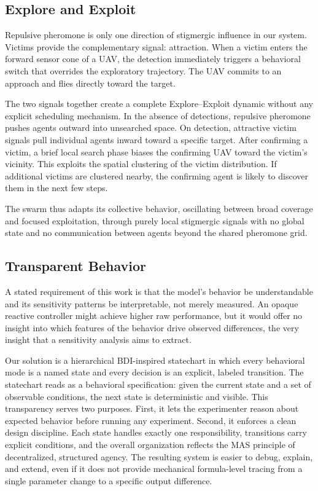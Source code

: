 \documentclass[10pt,a4paper,twocolumn]{article}
\begin{document}
\subsection{Explore and Exploit}

Repulsive pheromone is only one direction of stigmergic influence in our system. Victims provide the complementary signal: attraction. When a victim enters the forward sensor cone of a UAV, the detection immediately triggers a behavioral switch that overrides the exploratory trajectory. The UAV commits to an approach and flies directly toward the target.

The two signals together create a complete Explore--Exploit dynamic without any explicit scheduling mechanism. In the absence of detections, repulsive pheromone pushes agents outward into unsearched space. On detection, attractive victim signals pull individual agents inward toward a specific target. After confirming a victim, a brief local search phase biases the confirming UAV toward the victim's vicinity. This exploits the spatial clustering of the victim distribution. If additional victims are clustered nearby, the confirming agent is likely to discover them in the next few steps.

The swarm thus adapts its collective behavior, oscillating between broad coverage and focused exploitation, through purely local stigmergic signals with no global state and no communication between agents beyond the shared pheromone grid.

\subsection{Transparent Behavior}

A stated requirement of this work is that the model's behavior be understandable and its sensitivity patterns be interpretable, not merely measured. An opaque reactive controller might achieve higher raw performance, but it would offer no insight into which features of the behavior drive observed differences, the very insight that a sensitivity analysis aims to extract.

Our solution is a hierarchical BDI-inspired statechart in which every behavioral mode is a named state and every decision is an explicit, labeled transition. The statechart reads as a behavioral specification: given the current state and a set of observable conditions, the next state is deterministic and visible. This transparency serves two purposes. First, it lets the experimenter reason about expected behavior before running any experiment. Second, it enforces a clean design discipline. Each state handles exactly one responsibility, transitions carry explicit conditions, and the overall organization reflects the MAS principle of decentralized, structured agency. The resulting system is easier to debug, explain, and extend, even if it does not provide mechanical formula-level tracing from a single parameter change to a specific output difference.
\end{document}

